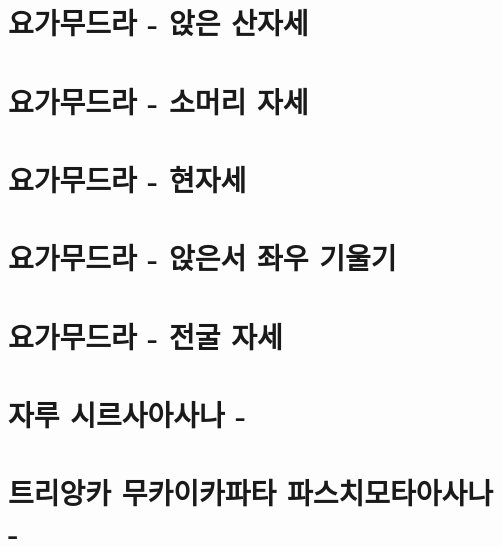 \documentclass[12pt, a4paper, oneside]{book}
\let\stdsection\section
\renewcommand\section{\newpage\stdsection}
\begin{document}
%
%
%
\section{요가무드라 - 앉은 산자세}

%
%
%
\section{요가무드라 - 소머리 자세}


%
%
%
\section{요가무드라 - 현자세}


%
%
%
	\section{요가무드라 - 앉은서 좌우 기울기}


%
%
%
	\section{요가무드라 - 전굴 자세}


%
%
%
	\section{자루 시르사아사나 - }

%
%
%
	\section{트리앙카 무카이카파타 파스치모타아사나 - }
\end{document}
